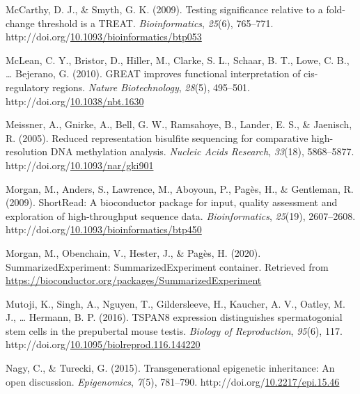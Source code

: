 \documentclass[12pt,twoside]{reedthesis}
\newlength{\cslhangindent}
\newenvironment{CSLReferences}[2] %
 {%
  \setlength{\parindent}{0pt}
  \ifodd #1 \everypar{\setlength{\hangindent}{\cslhangindent}}\ignorespaces\fi
  \ifnum #2 > 0
  \setlength{\parskip}{#2\baselineskip}
  \fi
 }%
 {}
\begin{document}
\begin{CSLReferences}{1}{0}
\leavevmode{}%
McCarthy, D. J., \& Smyth, G. K. (2009). Testing significance relative to a fold-change threshold is a TREAT. \emph{Bioinformatics}, \emph{25}(6), 765--771. http://doi.org/\href{https://doi.org/10.1093/bioinformatics/btp053}{10.1093/bioinformatics/btp053}

\leavevmode{}%
McLean, C. Y., Bristor, D., Hiller, M., Clarke, S. L., Schaar, B. T., Lowe, C. B., \ldots{} Bejerano, G. (2010). GREAT improves functional interpretation of cis-regulatory regions. \emph{Nature Biotechnology}, \emph{28}(5), 495--501. http://doi.org/\href{https://doi.org/10.1038/nbt.1630}{10.1038/nbt.1630}

\leavevmode{}%
Meissner, A., Gnirke, A., Bell, G. W., Ramsahoye, B., Lander, E. S., \& Jaenisch, R. (2005). Reduced representation bisulfite sequencing for comparative high-resolution DNA methylation analysis. \emph{Nucleic Acids Research}, \emph{33}(18), 5868--5877. http://doi.org/\href{https://doi.org/10.1093/nar/gki901}{10.1093/nar/gki901}

\leavevmode{}%
Morgan, M., Anders, S., Lawrence, M., Aboyoun, P., Pagès, H., \& Gentleman, R. (2009). ShortRead: A bioconductor package for input, quality assessment and exploration of high-throughput sequence data. \emph{Bioinformatics}, \emph{25}(19), 2607--2608. http://doi.org/\href{https://doi.org/10.1093/bioinformatics/btp450}{10.1093/bioinformatics/btp450}

\leavevmode{}%
Morgan, M., Obenchain, V., Hester, J., \& Pagès, H. (2020). SummarizedExperiment: SummarizedExperiment container. Retrieved from \url{https://bioconductor.org/packages/SummarizedExperiment}

\leavevmode{}%
Mutoji, K., Singh, A., Nguyen, T., Gildersleeve, H., Kaucher, A. V., Oatley, M. J., \ldots{} Hermann, B. P. (2016). TSPAN8 expression distinguishes spermatogonial stem cells in the prepubertal mouse testis. \emph{Biology of Reproduction}, \emph{95}(6), 117. http://doi.org/\href{https://doi.org/10.1095/biolreprod.116.144220}{10.1095/biolreprod.116.144220}

\leavevmode{}%
Nagy, C., \& Turecki, G. (2015). Transgenerational epigenetic inheritance: An open discussion. \emph{Epigenomics}, \emph{7}(5), 781--790. http://doi.org/\href{https://doi.org/10.2217/epi.15.46}{10.2217/epi.15.46}


\end{CSLReferences}
\end{document}
